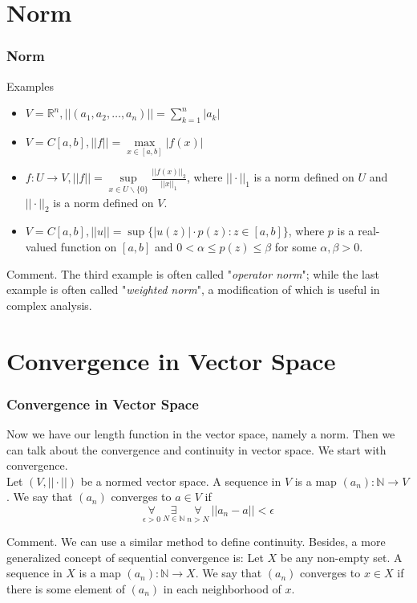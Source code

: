 \documentclass[12pt, t]{beamer}
\renewcommand{\emph}[1]{{\color{Turquoise3}\textsl{#1}}}
\begin{document}
\section{Norm}
\begin{frame}
    \frametitle{Norm}
    Examples\\

    \begin{itemize}
        \item $V=\mathbb{R}^n, ||(a_1,a_2,\dots,a_n)||=\sum^{n}_{k=1}|a_k|$
        \item $V=C[a,b], ||f||=\underset{x\in[a,b]}{\max}|f(x)|$
        \item $f:U\rightarrow V, ||f||=\underset{x\in U\backslash\{0\}}{\sup}\frac{||f(x)||_2}{||x||_1}$, where $||\cdot||_1$ is a norm defined on $U$ and $||\cdot||_2$ is a norm defined on $V$.
        \item $V=C[a,b], ||u||=\sup\{|u(z)|\cdot p(z):z\in[a,b]\}$, where $p$ is a real-valued function on $[a,b]$ and $0<\alpha\leq p(z)\leq \beta $ for some $\alpha,\beta>0$.
    \end{itemize}

    \vspace{1em}
    Comment. The third example is often called "\emph{operator norm}"; while the last example is often called "\emph{weighted norm}", a modification of which is useful in complex analysis.

\end{frame}

\section{Convergence in Vector Space}
\begin{frame}
    \frametitle{Convergence in Vector Space}
    Now we have our length function in the vector space, namely a norm. Then we can talk about the convergence and continuity in vector space. We start with convergence.\\
    \vspace{1em}
    \hspace{1em}
    Let $(V,||\cdot||)$ be a normed vector space. A sequence in $V$ is a map $(a_n):\mathbb{N}\rightarrow V$. We say that $(a_n)$ converges to $a\in V$ if
    \begin{equation*}
        \underset{\epsilon>0}{\forall}\ \underset{N\in\mathbb{N}}{\exists}\ \underset{n>N}{\forall}\ ||a_n-a||<\epsilon
    \end{equation*}

    \vspace{1em}
    Comment. We can use a similar method to define continuity. Besides, a more generalized concept of sequential convergence is: Let $X$ be any non-empty set.
    A sequence in $X$ is a map $(a_n):\mathbb{N}\rightarrow X$. We say that $(a_n)$  converges to $x\in X$ if there is some element of $(a_n)$ in each neighborhood of $x$.

\end{frame}
\end{document}
